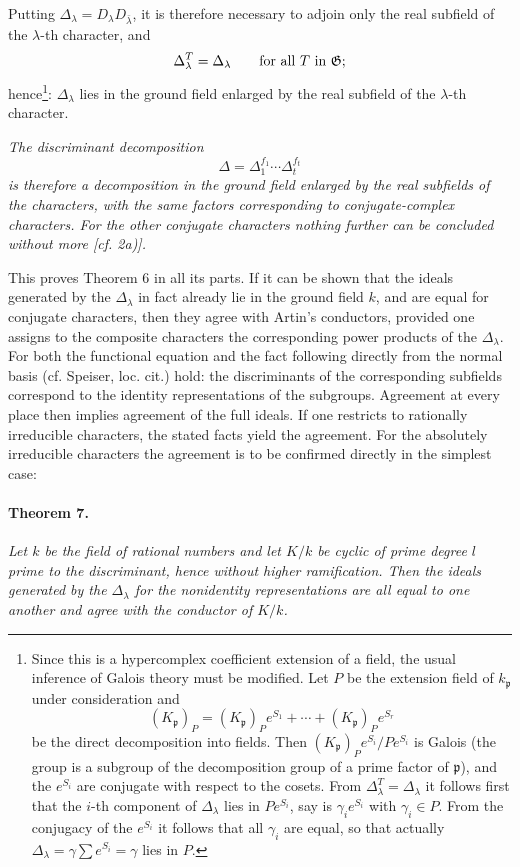 \documentclass[11pt]{article}
\providecommand{\frakp}{\mathfrak p}
\providecommand{\Gg}{\mathfrak G}
\begin{document}
Putting \(\Delta_\lambda=D_\lambda D_{\bar\lambda}\), it is therefore necessary to adjoin only the real subfield of the \(\lambda\)-th character, and
\[
        \Delta_\lambda^T=\Delta_\lambda
        \qquad\hbox{for all }T\hbox{ in }\Gg;
\]
hence\footnote{Since this is a hypercomplex coefficient extension of a field, the usual inference of Galois theory must be modified. Let \(P\) be the extension field of \(k_\frakp\) under consideration and
\[
        (K_\frakp)_P=(K_\frakp)_P e^{S_1}+\cdots+(K_\frakp)_P e^{S_r}
\]
be the direct decomposition into fields. Then \((K_\frakp)_P e^{S_i}/Pe^{S_i}\) is Galois (the group is a subgroup of the decomposition group of a prime factor of \(\frakp\)), and the \(e^{S_i}\) are conjugate with respect to the cosets. From \(\Delta_\lambda^T=\Delta_\lambda\) it follows first that the \(i\)-th component of \(\Delta_\lambda\) lies in \(Pe^{S_i}\), say is \(\gamma_i e^{S_i}\) with \(\gamma_i\in P\). From the conjugacy of the \(e^{S_i}\) it follows that all \(\gamma_i\) are equal, so that actually \(\Delta_\lambda=\gamma\sum e^{S_i}=\gamma\) lies in \(P\).}: \(\Delta_\lambda\) lies in the ground field enlarged by the real subfield of the \(\lambda\)-th character.

\emph{The discriminant decomposition}
\[
        \Delta=\Delta_1^{f_1}\cdots\Delta_t^{f_t}
\]
\emph{is therefore a decomposition in the ground field enlarged by the real subfields of the characters, with the same factors corresponding to conjugate-complex characters. For the other conjugate characters nothing further can be concluded without more [cf. 2a)].}

This proves Theorem 6 in all its parts. If it can be shown that the ideals generated by the \(\Delta_\lambda\) in fact already lie in the ground field \(k\), and are equal for conjugate characters, then they agree with Artin's conductors, provided one assigns to the composite characters the corresponding power products of the \(\Delta_\lambda\). For both the functional equation and the fact following directly from the normal basis (cf. Speiser, loc. cit.) hold: the discriminants of the corresponding subfields correspond to the identity representations of the subgroups. Agreement at every place then implies agreement of the full ideals. If one restricts to rationally irreducible characters, the stated facts yield the agreement. For the absolutely irreducible characters the agreement is to be confirmed directly in the simplest case:

\paragraph{Theorem 7.}
\emph{Let \(k\) be the field of rational numbers and let \(K/k\) be cyclic of prime degree \(l\) prime to the discriminant, hence without higher ramification. Then the ideals generated by the \(\Delta_\lambda\) for the nonidentity representations are all equal to one another and agree with the conductor of \(K/k\).}
\end{document}
